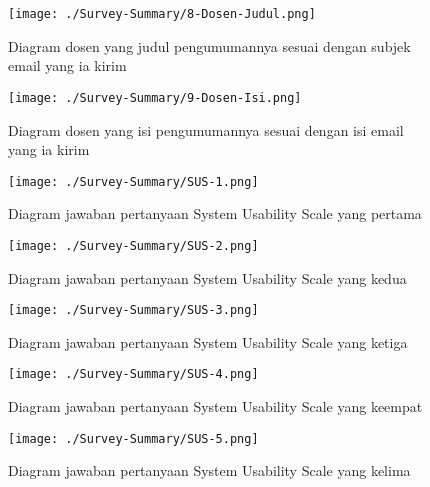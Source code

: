 \begin{figure}[H]
	\centering  
	\texttt{[image: ./Survey-Summary/8-Dosen-Judul.png]}
	\caption[Diagram dosen yang judul pengumumannya sesuai dengan subjek email yang ia kirim]{Diagram dosen yang judul pengumumannya sesuai dengan subjek email yang ia kirim} 
	\label{fig:summary-8-Dosen-Judul} 
\end{figure}

\begin{figure}[H]
	\centering  
	\texttt{[image: ./Survey-Summary/9-Dosen-Isi.png]}
	\caption[Diagram dosen yang isi pengumumannya sesuai dengan isi email yang ia kirim]{Diagram dosen yang isi  pengumumannya sesuai dengan isi email yang ia kirim} 
	\label{fig:summary-9-Dosen-Isi} 
\end{figure}

\begin{figure}[H]
	\centering  
	\texttt{[image: ./Survey-Summary/SUS-1.png]}
	\caption[Diagram jawaban pertanyaan System Usability Scale yang pertama]{Diagram jawaban pertanyaan System Usability Scale yang pertama} 
	\label{fig:summary-SUS-1} 
\end{figure}

\begin{figure}[H]
	\centering  
	\texttt{[image: ./Survey-Summary/SUS-2.png]}
	\caption[Diagram jawaban pertanyaan System Usability Scale yang kedua]{Diagram jawaban pertanyaan System Usability Scale yang kedua} 
	\label{fig:summary-SUS-2} 
\end{figure}

\begin{figure}[H]
	\centering  
	\texttt{[image: ./Survey-Summary/SUS-3.png]}
	\caption[Diagram jawaban pertanyaan System Usability Scale yang ketiga]{Diagram jawaban pertanyaan System Usability Scale yang ketiga} 
	\label{fig:summary-SUS-3} 
\end{figure}

\begin{figure}[H]
	\centering  
	\texttt{[image: ./Survey-Summary/SUS-4.png]}
	\caption[Diagram jawaban pertanyaan System Usability Scale yang keempat]{Diagram jawaban pertanyaan System Usability Scale yang keempat} 
	\label{fig:summary-SUS-4} 
\end{figure}

\begin{figure}[H]
	\centering  
	\texttt{[image: ./Survey-Summary/SUS-5.png]}
	\caption[Diagram jawaban pertanyaan System Usability Scale yang kelima]{Diagram jawaban pertanyaan System Usability Scale yang kelima} 
	\label{fig:summary-SUS-5} 
\end{figure}

